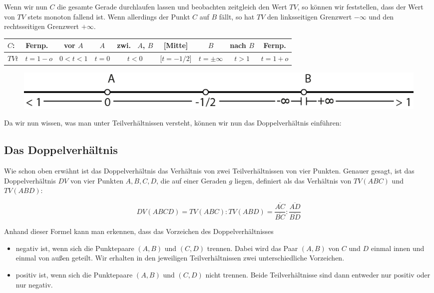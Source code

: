 \documentclass[12pt,a4paper]{article}
\begin{document}
Wenn wir nun $C$ die gesamte Gerade durchlaufen lassen und beobachten zeitgleich den Wert $TV$, so können wir feststellen, dass der Wert von $TV$ stets monoton fallend ist. Wenn allerdings der Punkt $C$ auf $B$ fällt, so hat $TV$ den linksseitigen Grenzwert $-\infty$ und den rechtsseitigen Grenzwert $+\infty$.
\newpage
\begin{center}
\begin{scriptsize}
\begin{tabular}[htbp]{l|c|c|c|c|c|c|c|c}
$C$: & Fernp.~ & vor $A$ &  $A$ & zwi.~ $A$, $B$ & [Mitte] & $B$ & nach $B$ & Fernp.\\
\hline
$TV t$ & $t = 1 - o$ & $0 < t < 1$ & $t = 0$ & $t < 0$ & [$t = -1/2$] & $t = \pm\infty$ & $t > 1$ & $t = 1 + o$\\
\end{tabular}
\end{scriptsize}
\end{center}

\begin{figure}[htbp]
\centering
\includegraphics[width=\textwidth]{Bilder/tv_strahl.png}
\end{figure}

Da wir nun wissen, was man unter Teilverhältnissen versteht, können wir nun das Doppelverhältnis einführen:

\subsection{Das Doppelverhältnis}

Wie schon oben erwähnt ist das Doppelverhältnis das Verhältnis von zwei Teilverhältnissen von vier Punkten. Genauer gesagt, ist das Doppelverhältnis $DV$ von vier Punkten $A, B, C, D$, die auf einer Geraden $g$ liegen, definiert als das Verhältnis von $TV(A B C)$ und $TV(A B D)$:

\[DV(A B C D) = TV(A B C) : TV(A B D) = \dfrac{\overline{A C}}{\overline{B C}} : \dfrac{\overline{A D}}{\overline{B D}}\]

Anhand dieser Formel kann man erkennen, dass das Vorzeichen des Doppelverhältnisses
\begin{itemize}
\item negativ ist, wenn sich die Punktepaare $(A, B)$ und $(C, D)$ trennen. Dabei wird das Paar $(A, B)$ von $C$ und $D$ einmal innen und einmal von außen geteilt. Wir erhalten in den jeweiligen Teilverhältnissen zwei unterschiedliche Vorzeichen.
\item positiv ist, wenn sich die Punktepaare $(A, B)$ und $(C, D)$ nicht trennen. Beide Teilverhältnisse sind dann entweder nur positiv oder nur negativ.
\end{itemize}
\end{document}
